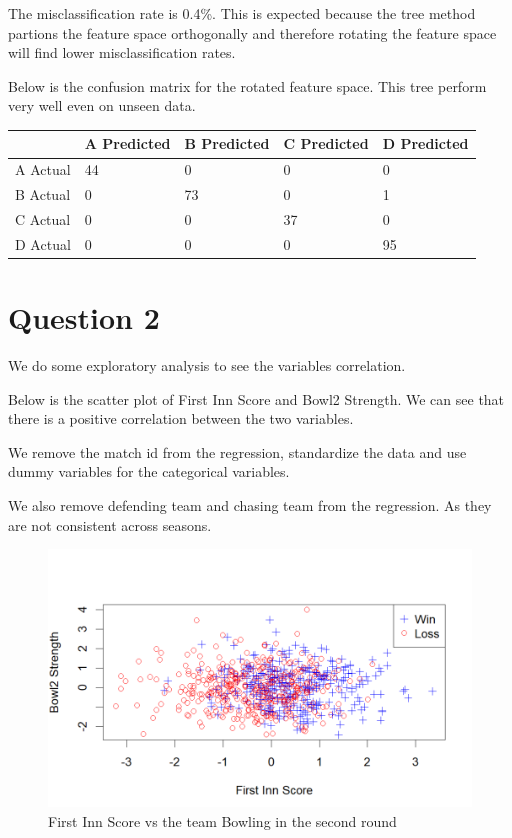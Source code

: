 \documentclass[
]{article}
\begin{document}
The misclassification rate is 0.4\%. This is expected because the tree
method partions the feature space orthogonally and therefore rotating
the feature space will find lower misclassification rates.

Below is the confusion matrix for the rotated feature space. This tree
perform very well even on unseen data.

\begin{longtable}[]{@{}lllll@{}}
\toprule\noalign{}
& A Predicted & B Predicted & C Predicted & D Predicted \\
\midrule\noalign{}
\endhead
\bottomrule\noalign{}
\endlastfoot
A Actual & 44 & 0 & 0 & 0 \\
B Actual & 0 & 73 & 0 & 1 \\
C Actual & 0 & 0 & 37 & 0 \\
D Actual & 0 & 0 & 0 & 95 \\
\end{longtable}

\hypertarget{question-2}{%
\section{Question 2}\label{question-2}}

We do some exploratory analysis to see the variables correlation.

Below is the scatter plot of First Inn Score and Bowl2 Strength. We can
see that there is a positive correlation between the two variables.

We remove the match id from the regression, standardize the data and use
dummy variables for the categorical variables.

We also remove defending team and chasing team from the regression. As
they are not consistent across seasons.

\begin{figure}
\centering
\includegraphics[width=4.63542in,height=\textheight]{scatter_first_innsscore.png}
\caption{First Inn Score vs the team Bowling in the second round}
\end{figure}
\end{document}
